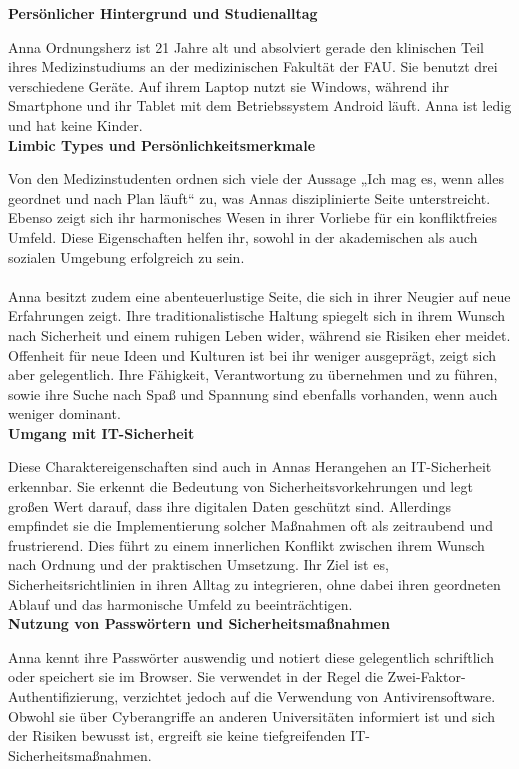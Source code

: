 \documentclass[german,report]{i1thesis}
\begin{document}
\textbf{Persönlicher Hintergrund und Studienalltag}

Anna Ordnungsherz ist 21 Jahre alt und absolviert gerade den klinischen Teil ihres Medizinstudiums an der medizinischen Fakultät der FAU. Sie benutzt drei verschiedene Geräte. Auf ihrem Laptop nutzt sie Windows, während ihr Smartphone und ihr Tablet mit dem Betriebssystem Android läuft. Anna ist ledig und hat keine Kinder.\\

\textbf{Limbic Types und Persönlichkeitsmerkmale}

Von den Medizinstudenten ordnen sich viele der Aussage „Ich mag es, wenn alles geordnet und nach Plan läuft“ zu, was Annas disziplinierte Seite unterstreicht. Ebenso zeigt sich ihr harmonisches Wesen in ihrer Vorliebe für ein konfliktfreies Umfeld. Diese Eigenschaften helfen ihr, sowohl in der akademischen als auch sozialen Umgebung erfolgreich zu sein.\\
\\
Anna besitzt zudem eine abenteuerlustige Seite, die sich in ihrer Neugier auf neue Erfahrungen zeigt. Ihre traditionalistische Haltung spiegelt sich in ihrem Wunsch nach Sicherheit und einem ruhigen Leben wider, während sie Risiken eher meidet. Offenheit für neue Ideen und Kulturen ist bei ihr weniger ausgeprägt, zeigt sich aber gelegentlich. Ihre Fähigkeit, Verantwortung zu übernehmen und zu führen, sowie ihre Suche nach Spaß und Spannung sind ebenfalls vorhanden, wenn auch weniger dominant.\\

\textbf{Umgang mit IT-Sicherheit}

Diese Charaktereigenschaften sind auch in Annas Herangehen an IT-Sicherheit erkennbar. Sie erkennt die Bedeutung von Sicherheitsvorkehrungen und legt großen Wert darauf, dass ihre digitalen Daten geschützt sind. Allerdings empfindet sie die Implementierung solcher Maßnahmen oft als zeitraubend und frustrierend. Dies führt zu einem innerlichen Konflikt zwischen ihrem Wunsch nach Ordnung und der praktischen Umsetzung. Ihr Ziel ist es, Sicherheitsrichtlinien in ihren Alltag zu integrieren, ohne dabei ihren geordneten Ablauf und das harmonische Umfeld zu beeinträchtigen.\\

\textbf{Nutzung von Passwörtern und Sicherheitsmaßnahmen}

Anna kennt ihre Passwörter auswendig und notiert diese gelegentlich schriftlich oder speichert sie im Browser. Sie verwendet in der Regel die Zwei-Faktor-Authentifizierung, verzichtet jedoch auf die Verwendung von Antivirensoftware. Obwohl sie über Cyberangriffe an anderen Universitäten informiert ist und sich der Risiken bewusst ist, ergreift sie keine tiefgreifenden IT-Sicherheitsmaßnahmen.\\
\end{document}
